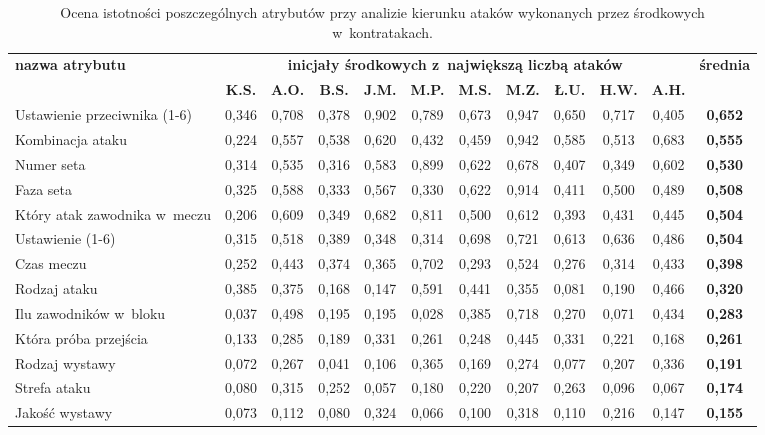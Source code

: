 \documentclass[a4paper,twoside,12pt]{book}
\begin{document}
\begin{table}
\centering
\caption{Ocena istotności poszczególnych atrybutów przy analizie kierunku ataków wykonanych przez środkowych w~kontratakach.}
\label{tab:atrybutyAtakŚrodkowiKontry}
\begin{adjustbox}{angle=90}
\begin{tabular}{|l|c|c|c|c|c|c|c|c|c|c|c|}
\hline
\multirow{2}{*}{\textbf{nazwa atrybutu}} &
\multicolumn{10}{c|}{\textbf{inicjały środkowych z~największą liczbą ataków}} & 
\multirow{2}{*}{\textbf{średnia}}\\
\cline{2-11} & \textbf{K.S.} & \textbf{A.O.} & \textbf{B.S.} & \textbf{J.M.} & \textbf{M.P.} & \textbf{M.S.} & \textbf{M.Z.} & \textbf{Ł.U.} & \textbf{H.W.} & \textbf{A.H.} & \\
\hline
 Ustawienie przeciwnika (1-6) & 0,346 & \cellcolor{green}0,708 & 0,378 & \cellcolor{green}0,902 & 0,789 & 0,673 & \cellcolor{green}0,947 & \cellcolor{green}0,650 & \cellcolor{green}0,717 & 0,405 & \textbf{0,652} \\ \hline
 Kombinacja ataku & 0,224 & 0,557 & \cellcolor{green}0,538 & 0,620 & 0,432 & 0,459 & 0,942 & 0,585 & 0,513 & \cellcolor{green}0,683 & \textbf{0,555} \\ \hline
 Numer seta & 0,314 & 0,535 & 0,316 & 0,583 & \cellcolor{green}0,899 & 0,622 & 0,678 & 0,407 & 0,349 & 0,602 & \textbf{0,530} \\ \hline
 Faza seta & 0,325 & 0,588 & 0,333 & 0,567 & 0,330 & 0,622 & 0,914 & 0,411 & 0,500 & 0,489 & \textbf{0,508} \\ \hline
 Który atak zawodnika w~meczu & 0,206 & 0,609 & 0,349 & 0,682 & 0,811 & 0,500 & 0,612 & 0,393 & 0,431 & 0,445 & \textbf{0,504} \\ \hline
 Ustawienie (1-6) & 0,315 & 0,518 & 0,389 & 0,348 & 0,314 & \cellcolor{green}0,698 & 0,721 & 0,613 & 0,636 & 0,486 & \textbf{0,504} \\ \hline
 Czas meczu & 0,252 & 0,443 & 0,374 & 0,365 & 0,702 & 0,293 & 0,524 & 0,276 & 0,314 & 0,433 & \textbf{0,398} \\ \hline
 Rodzaj ataku & \cellcolor{green}0,385 & 0,375 & 0,168 & 0,147 & 0,591 & 0,441 & 0,355 & 0,081 & 0,190 & 0,466 & \textbf{0,320} \\ \hline
 Ilu zawodników w~bloku & 0,037 & 0,498 & 0,195 & 0,195 & 0,028 & 0,385 & 0,718 & 0,270 & 0,071 & 0,434 & \textbf{0,283} \\ \hline
 Która próba przejścia & 0,133 & 0,285 & 0,189 & 0,331 & 0,261 & 0,248 & 0,445 & 0,331 & 0,221 & 0,168 & \textbf{0,261} \\ \hline
 Rodzaj wystawy & 0,072 & 0,267 & 0,041 & 0,106 & 0,365 & 0,169 & 0,274 & 0,077 & 0,207 & 0,336 & \textbf{0,191} \\ \hline
 Strefa ataku & 0,080 & 0,315 & 0,252 & 0,057 & 0,180 & 0,220 & 0,207 & 0,263 & 0,096 & 0,067 & \textbf{0,174} \\ \hline
 Jakość wystawy & 0,073 & 0,112 & 0,080 & 0,324 & 0,066 & 0,100 & 0,318 & 0,110 & 0,216 & 0,147 & \textbf{0,155} \\ \hline
\end{tabular}
\end{adjustbox}
\end{table}
\end{document}
